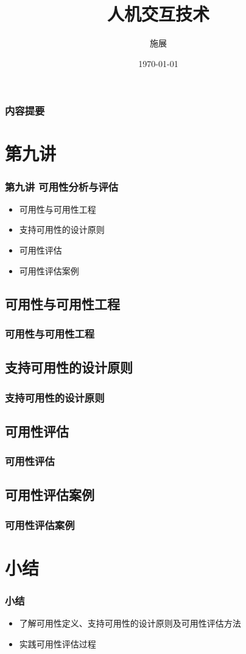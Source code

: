 \documentclass{beamer}
\title{人机交互技术}
\author{施展}
\institute{华中科技大学~武汉光电国家实验室}
\date{\today}
\begin{document}
\begin{frame}
	\titlepage
\end{frame}

\begin{frame}
	\frametitle{内容提要}
	\tableofcontents
\end{frame}

\section{第九讲}
\begin{frame}
	\frametitle{第九讲 可用性分析与评估}
	\begin{itemize}
		\item 可用性与可用性工程
		\item 支持可用性的设计原则
		\item 可用性评估
		\item 可用性评估案例
	\end{itemize}
\end{frame}

\subsection{可用性与可用性工程}
\begin{frame}
	\frametitle{可用性与可用性工程}

\end{frame}

\subsection{支持可用性的设计原则}
\begin{frame}
	\frametitle{支持可用性的设计原则}

\end{frame}

\subsection{可用性评估}
\begin{frame}
	\frametitle{可用性评估}

\end{frame}

\subsection{可用性评估案例}
\begin{frame}
	\frametitle{可用性评估案例}

\end{frame}

\section{小结}
\begin{frame}
	\frametitle{小结}
	\begin{itemize}
		\item 了解可用性定义、支持可用性的设计原则及可用性评估方法
		\item 实践可用性评估过程
	\end{itemize}
\end{frame}
\end{document}
